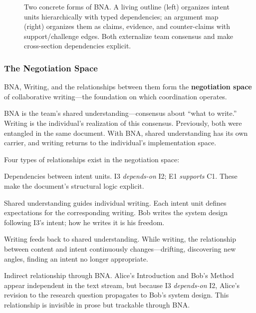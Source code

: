 \begin{figure}[t]
\centering
{}
\caption{Two concrete forms of BNA. A living outline (left) organizes intent units hierarchically with typed dependencies; an argument map (right) organizes them as claims, evidence, and counter-claims with support/challenge edges. Both externalize team consensus and make cross-section dependencies explicit.}
\label{fig:bna-forms}
\end{figure}


\subsubsection{The Negotiation Space}

BNA, Writing, and the relationships between them form the \textbf{negotiation space} of collaborative writing---the foundation on which coordination operates.

BNA is the team's shared understanding---consensus about ``what to write.'' Writing is the individual's realization of this consensus. Previously, both were entangled in the same document. With BNA, shared understanding has its own carrier, and writing returns to the individual's implementation space.

Four types of relationships exist in the negotiation space:

\begin{description}[leftmargin=1.5em, nosep, itemsep=3pt]
\item[BNA $\leftrightarrow$ BNA:] Dependencies between intent units. I3 \emph{depends-on} I2; E1 \emph{supports} C1. These make the document's structural logic explicit.

\item[BNA $\rightarrow$ Writing:] Shared understanding guides individual writing. Each intent unit defines expectations for the corresponding writing. Bob writes the system design following I3's intent; how he writes it is his freedom.

\item[Writing $\rightarrow$ BNA:] Writing feeds back to shared understanding. While writing, the relationship between content and intent continuously changes---drifting, discovering new angles, finding an intent no longer appropriate.

\item[Writing $\leftrightarrow$ Writing:] Indirect relationship through BNA. Alice's Introduction and Bob's Method appear independent in the text stream, but because I3 \emph{depends-on} I2, Alice's revision to the research question propagates to Bob's system design. This relationship is invisible in prose but trackable through BNA.
\end{description}

